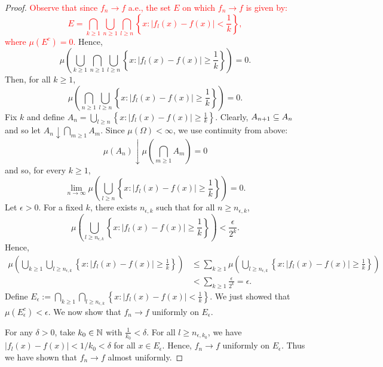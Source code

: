\begin{proof}
    \textcolor{red}{Observe that since $f_n \to f$ a.e., the set $E$ on which $f_n \to f$ is given by:
    $$ E = \bigcap_{k \geq 1}\bigcup_{n \geq 1}\bigcap_{l \geq n} \left\{x : |f_l(x) - f(x)| < \frac{1}{k} \right\},$$
    where $\mu(E^c) = 0$.} Hence,
    $$ \mu \left( \bigcup_{k \geq 1}\bigcap_{n \geq 1}\bigcup_{l \geq n} \left\{x : |f_l(x) - f(x)| \geq \frac{1}{k} \right\} \right) = 0 .$$
    Then, for all $k \geq 1$, 
    $$ \mu \left( \bigcap_{n \geq 1}\bigcup_{l \geq n} \left\{x : |f_l(x) - f(x)| \geq \frac{1}{k} \right\} \right) = 0 .$$
    Fix $k$ and define $A_n = \bigcup_{l \geq n} \left\{x : |f_l(x) - f(x)| \geq \frac{1}{k} \right\}$. Clearly, $A_{n + 1} \subseteq A_n$ and so let $A_n \downarrow \bigcap_{m \geq 1} A_m$. Since $\mu(\Omega) < \infty$, we use continuity from above:
    $$ \mu(A_n) \downarrow \mu\left( \bigcap_{m \geq 1} A_m \right) = 0 $$
    and so, for every $k \geq 1$,  
    $$ \lim_{n \to \infty} \mu \left( \bigcup_{l \geq n} \left\{x : |f_l(x) - f(x)| \geq \frac{1}{k} \right\} \right) = 0.$$
    Let $\epsilon > 0$. For a fixed $k$, there exists $n_{\epsilon, k}$ such that for all $n \geq n_{\epsilon, k}$, 
    $$ \mu \left( \bigcup_{l \geq n_{\epsilon, k}} \left\{x : |f_l(x) - f(x)| \geq \frac{1}{k} \right\} \right) < \frac{\epsilon}{2^k}.$$
    Hence, 
    \begin{align*}
    \mu \left( \bigcup_{k \geq 1}\bigcup_{l \geq n_{\epsilon, k}} \left\{x : |f_l(x) - f(x)| \geq \frac{1}{k} \right\} \right) 
    &\leq \sum_{k \geq 1} \mu \left( \bigcup_{l \geq n_{\epsilon, k}} \left\{x : |f_l(x) - f(x)| \geq \frac{1}{k} \right\} \right) \\
    &< \sum_{k \geq 1} \frac{\epsilon}{2^k} = \epsilon. 
    \end{align*}
    Define $E_\epsilon := \bigcap_{k \geq 1}\bigcap_{l \geq n_{\epsilon, k}} \left\{x : |f_l(x) - f(x)| < \frac{1}{k} \right\}$. We just showed that $\mu(E_\epsilon^c) < \epsilon$. We now show that $f_n \to f$ uniformly on $E_\epsilon$. 
    
    For any $\delta > 0$, take $k_0 \in \mathbb{N}$ with $\frac{1}{k_0} < \delta$. For all $l \geq n_{\epsilon, k_0}$, we have $|f_l(x) - f(x)| < 1/k_0 < \delta$ for all $x \in E_\epsilon$. Hence, $f_n \to f$ uniformly on $E_\epsilon$. Thus we have shown that $f_n \to f$ almost uniformly. 
\end{proof}